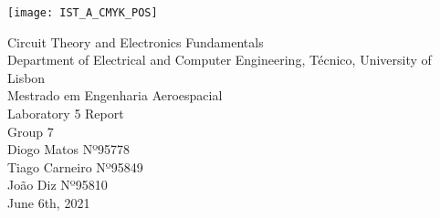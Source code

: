 
\thispagestyle {empty}

\texttt{[image: IST\_A\_CMYK\_POS]}

\begin{center}
%
\vspace{1.0cm}

\vspace{1cm}
{\FontLb Circuit Theory and Electronics Fundamentals} \\ %
\vspace{1cm}
{\FontSn Department of Electrical and Computer Engineering, Técnico, University of Lisbon} \\ %
{\FontSn Mestrado em Engenharia Aeroespacial} \\
\vspace{3cm}
{\FontSn Laboratory 5 Report} \\[1cm]
{\FontSn Group 7} \\[2cm]
{\FontSn Diogo Matos Nº95778} \\
{\FontSn Tiago Carneiro Nº95849} \\
{\FontSn João Diz Nº95810} \\
\vspace{10cm}
{\FontSn June 6th, 2021} \\ %
%
\end{center}

